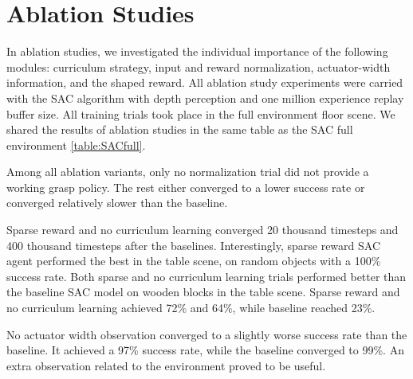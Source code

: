 \section{Ablation Studies}

In ablation studies, we investigated the individual importance of the following modules: curriculum strategy, input and reward normalization, actuator-width information, and the shaped reward. All ablation study experiments were carried with the SAC algorithm with depth perception and one million experience replay buffer size. All training trials took place in the full environment floor scene. We shared the results of ablation studies in the same table as the SAC full environment \ref{table:SACfull}.

Among all ablation variants, only no normalization trial did not provide a working grasp policy. The rest either converged to a lower success rate or converged relatively slower than the baseline. 

Sparse reward and no curriculum learning converged 20 thousand timesteps and 400 thousand timesteps after the baselines. Interestingly, sparse reward SAC agent performed the best in the table scene, on random objects with a 100\% success rate. Both sparse and no curriculum learning trials performed better than the baseline SAC model on wooden blocks in the table scene. Sparse reward and no curriculum learning achieved 72\% and 64\%, while baseline reached 23\%.

No actuator width observation converged to a slightly worse success rate than the baseline.  It achieved a 97\% success rate, while the baseline converged to 99\%. An extra observation related to the environment proved to be useful.

